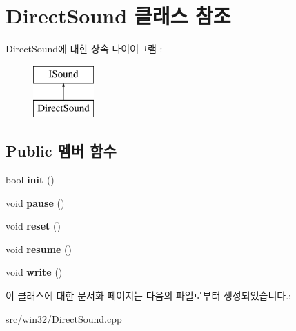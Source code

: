 \hypertarget{class_direct_sound}{}\section{Direct\+Sound 클래스 참조}
\label{class_direct_sound}
Direct\+Sound에 대한 상속 다이어그램 \+: \begin{figure}[H]
\begin{center}
\leavevmode
\includegraphics[height=2.000000cm]{class_direct_sound}
\end{center}
\end{figure}
\subsection*{Public 멤버 함수}
\begin{DoxyCompactItemize}
\item 
\mbox{\label{class_direct_sound_a006583b3b3c1b16ca4c54bf9a6141fb9}} 
bool {\bfseries init} ()
\item 
\mbox{\label{class_direct_sound_a33ee46c99ddf8f06bd6605ec14798f4b}} 
void {\bfseries pause} ()
\item 
\mbox{\label{class_direct_sound_aa947e57a1a67df3a609cd403b8c97bb8}} 
void {\bfseries reset} ()
\item 
\mbox{\label{class_direct_sound_a529b060d31bb252968bc9a387a7dc9ad}} 
void {\bfseries resume} ()
\item 
\mbox{\label{class_direct_sound_a2e2a78f3a6719920fb2a9dfc48e4b1db}} 
void {\bfseries write} ()
\end{DoxyCompactItemize}


이 클래스에 대한 문서화 페이지는 다음의 파일로부터 생성되었습니다.\+:\begin{DoxyCompactItemize}
\item 
src/win32/Direct\+Sound.\+cpp\end{DoxyCompactItemize}
